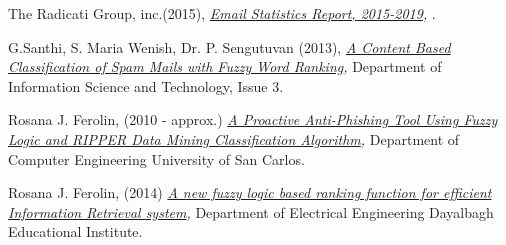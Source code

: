 \documentclass[journal]{IEEEtran}
\begin{document}
\begin{thebibliography}{9}
    The Radicati Group, inc.(2015),
    \textit{
        \href{https://github.com/Menziess/Fuzzy-Logic-Email-Classification/raw/master/report/res/a_new_fuzzy_logic_based_ranking_function_for_efficient_information_retrieval_system.pdf}{Email Statistics Report, 2015-2019},
    }.

    G.Santhi, S. Maria Wenish, Dr. P. Sengutuvan (2013),
    \textit{
        \href{https://github.com/Menziess/Fuzzy-Logic-Email-Classification/raw/master/report/res/a_content_based_classification_of_spam_mails_with_fuzzy_word_ranking.pdf}{A Content Based Classification of Spam Mails with Fuzzy Word Ranking},
    }
    Department of Information Science and Technology,
    Issue 3.

    Rosana J. Ferolin, (2010 - approx.)
    \textit{
        \href{https://github.com/Menziess/Fuzzy-Logic-Email-Classification/raw/master/report/res/a_proactive_anti-phishing_tool_using_fuzzy_logic_and_ripper_data_mining_classification_algorithm.pdf}{A Proactive Anti-Phishing Tool Using Fuzzy Logic and RIPPER Data Mining Classification Algorithm},
    }
    Department of Computer Engineering University of San Carlos.

    Rosana J. Ferolin, (2014)
    \textit{
        \href{https://github.com/Menziess/Fuzzy-Logic-Email-Classification/raw/master/report/res/a_new_fuzzy_logic_based_ranking_function_for_efficient_information_retrieval_system.pdf}{A new fuzzy logic based ranking function for efficient Information Retrieval system},
    }
    Department of Electrical Engineering Dayalbagh Educational Institute.

\end{thebibliography}
\end{document}
